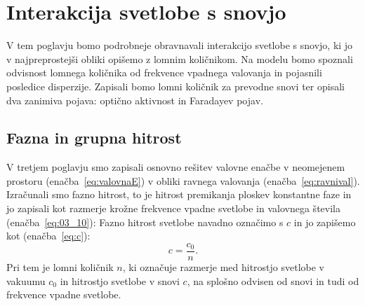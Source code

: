 
\chapter{Interakcija svetlobe s snovjo}
V tem poglavju bomo podrobneje obravnavali interakcijo svetlobe s snovjo, ki jo 
v najpreprostejši obliki opišemo z lomnim količnikom. Na modelu
bomo spoznali odvisnost lomnega količnika od frekvence vpadnega valovanja in pojasnili
posledice disperzije. Zapisali bomo lomni količnik za prevodne snovi ter
opisali dva zanimiva pojava: optično aktivnost in Faradayev pojav.

\section{Fazna in grupna hitrost}
V tretjem poglavju smo zapisali osnovno rešitev valovne enačbe
v neomejenem prostoru (enačba~\ref{eq:valovnaE}) v obliki ravnega valovanja 
(enačba~\ref{eq:ravnival}). Izračunali smo fazno hitrost,
to je hitrost premikanja ploskev konstantne faze in
jo zapisali kot razmerje krožne frekvence vpadne svetlobe 
in valovnega števila (enačba~\ref{eq:03_10}):
Fazno hitrost svetlobe navadno označimo s $c$ in jo zapišemo kot (enačba~\ref{eq:c}):
\begin{equation}
c = \frac{c_0}{n}.
\label{eq:09_01}
\end{equation}
Pri tem je lomni količnik $n$, ki označuje razmerje med hitrostjo svetlobe v 
vakuumu $c_0$ in hitrostjo svetlobe v snovi $c$, na splošno odvisen 
od snovi  in tudi od frekvence vpadne svetlobe.

